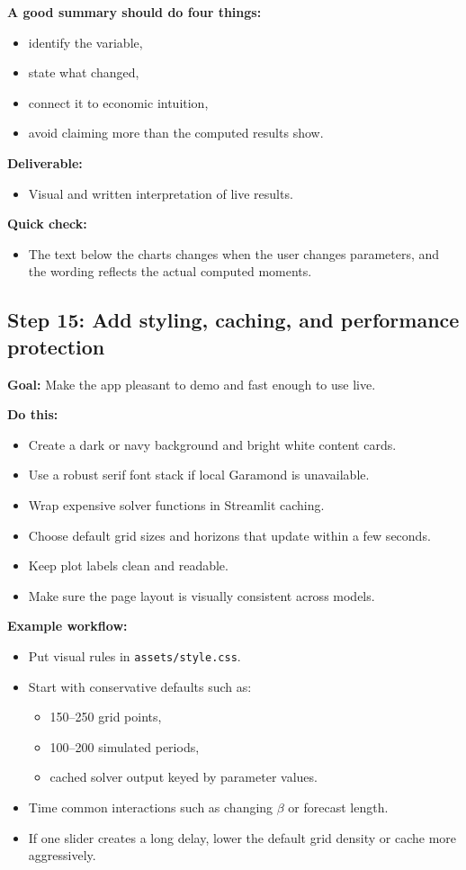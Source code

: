 \documentclass[11pt]{article}
\begin{document}
\textbf{A good summary should do four things:}
\begin{itemize}
    \item identify the variable,
    \item state what changed,
    \item connect it to economic intuition,
    \item avoid claiming more than the computed results show.
\end{itemize}

\textbf{Deliverable:}
\begin{itemize}
    \item Visual and written interpretation of live results.
\end{itemize}

\textbf{Quick check:}
\begin{itemize}
    \item The text below the charts changes when the user changes parameters, and the wording reflects the actual computed moments.
\end{itemize}

\subsection{Step 15: Add styling, caching, and performance protection}
\textbf{Goal:} Make the app pleasant to demo and fast enough to use live.

\textbf{Do this:}
\begin{itemize}
    \item Create a dark or navy background and bright white content cards.
    \item Use a robust serif font stack if local Garamond is unavailable.
    \item Wrap expensive solver functions in Streamlit caching.
    \item Choose default grid sizes and horizons that update within a few seconds.
    \item Keep plot labels clean and readable.
    \item Make sure the page layout is visually consistent across models.
\end{itemize}

\textbf{Example workflow:}
\begin{itemize}
    \item Put visual rules in \verb|assets/style.css|.
    \item Start with conservative defaults such as:
    \begin{itemize}
        \item 150--250 grid points,
        \item 100--200 simulated periods,
        \item cached solver output keyed by parameter values.
    \end{itemize}
    \item Time common interactions such as changing \(\beta\) or forecast length.
    \item If one slider creates a long delay, lower the default grid density or cache more aggressively.
\end{itemize}
\end{document}
